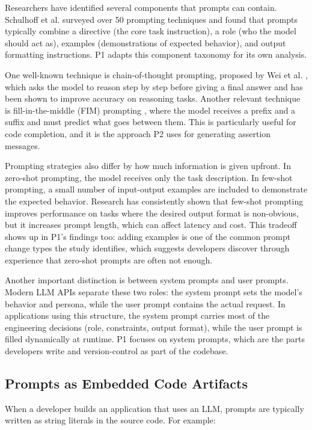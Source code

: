 \documentclass[
    pdftex,
    final,
    11pt,
    a4paper,
    parskip=false,
    oneside,
    footheight=0mm,
    footinclude=false,
    toc=bibliography
]{scrbook}
\begin{document}
Researchers have identified several components that prompts can contain. Schulhoff et al. \cite{Schulhoff2024} surveyed over 50 prompting techniques and found that prompts typically combine a directive (the core task instruction), a role (who the model should act as), examples (demonstrations of expected behavior), and output formatting instructions. P1 adapts this component taxonomy for its own analysis.

One well-known technique is chain-of-thought prompting, proposed by Wei et al. \cite{Wei2022}, which asks the model to reason step by step before giving a final answer and has been shown to improve accuracy on reasoning tasks. Another relevant technique is fill-in-the-middle (FIM) prompting \cite{Bavarian2022}, where the model receives a prefix and a suffix and must predict what goes between them. This is particularly useful for code completion, and it is the approach P2 uses for generating assertion messages.

Prompting strategies also differ by how much information is given upfront. In zero-shot prompting, the model receives only the task description. In few-shot prompting, a small number of input-output examples are included to demonstrate the expected behavior. Research has consistently shown that few-shot prompting improves performance on tasks where the desired output format is non-obvious, but it increases prompt length, which can affect latency and cost. This tradeoff shows up in P1's findings too: adding examples is one of the common prompt change types the study identifies, which suggests developers discover through experience that zero-shot prompts are often not enough.

Another important distinction is between system prompts and user prompts. Modern LLM APIs separate these two roles: the system prompt sets the model's behavior and persona, while the user prompt contains the actual request. In applications using this structure, the system prompt carries most of the engineering decisions (role, constraints, output format), while the user prompt is filled dynamically at runtime. P1 focuses on system prompts, which are the parts developers write and version-control as part of the codebase.

\subsection{Prompts as Embedded Code Artifacts}

When a developer builds an application that uses an LLM, prompts are typically written as string literals in the source code. For example:
\end{document}
